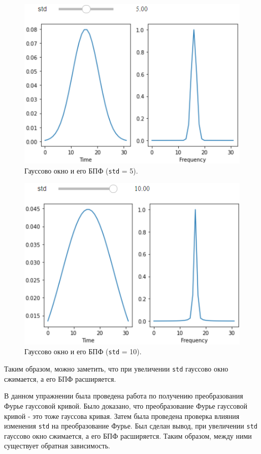 \documentclass[a4paper, 14pt]{extarticle}
\begin{document}
    \begin{figure}[H]
        \centering
        \includegraphics[width=0.8\linewidth]{resources/Images/task2_std5}
        \caption{Гауссово окно и его БПФ (\texttt{std} = 5).}
        \label{fig:task2_std5}
    \end{figure}

    \begin{figure}[H]
        \centering
        \includegraphics[width=0.8\linewidth]{resources/Images/task2_std10}
        \caption{Гауссово окно и его БПФ (\texttt{std} = 10).}
        \label{fig:task2_std10}
    \end{figure}

    Таким образом, можно заметить, что при увеличении \texttt{std} гауссово окно сжимается, а его БПФ расширяется.

    В данном упражнении была проведена работа по получению преобразования Фурье гауссовой кривой. Было доказано, что
    преобразование Фурье гауссовой кривой - это тоже гауссова кривая. Затем была проведена проверка влияния изменения
    \texttt{std} на преобразование Фурье. Был сделан вывод, при увеличении \texttt{std} гауссово окно сжимается, а его
    БПФ расширяется. Таким образом, между ними существует обратная зависимость.
\end{document}
